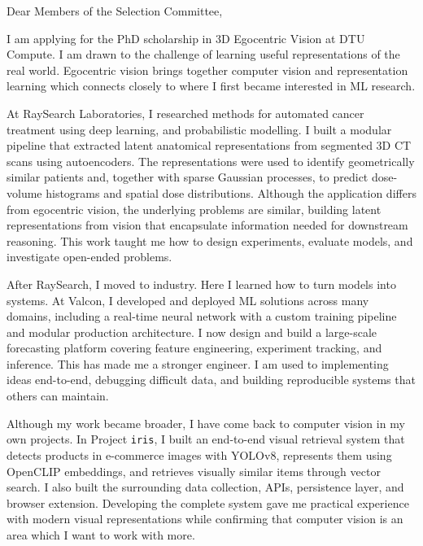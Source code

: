 \documentclass[11pt,a4paper]{moderncv}
\begin{document}
\makecvtitle
Dear Members of the Selection Committee,

\vspace*{2em}
I am applying for the PhD scholarship in 3D Egocentric Vision at DTU Compute. I am drawn to the challenge of learning useful representations of the real world. Egocentric vision brings together computer vision and representation learning which connects closely to where I first became interested in ML research.

\hspace*{2em}
At RaySearch Laboratories, I researched methods for automated cancer treatment using deep learning, and probabilistic modelling. I built a modular pipeline that extracted latent anatomical representations from segmented 3D CT scans using autoencoders. The representations were used to identify geometrically similar patients and, together with sparse Gaussian processes, to predict dose-volume histograms and spatial dose distributions. Although the application differs from egocentric vision, the underlying problems are similar, building latent representations from vision that encapsulate information needed for downstream reasoning. This work taught me how to design experiments, evaluate models, and investigate open-ended problems.

\hspace*{2em}
After RaySearch, I moved to industry. Here I learned how to turn models into systems. At Valcon, I developed and deployed ML solutions across many domains, including a real-time neural network with a custom training pipeline and modular production architecture. I now design and build a large-scale forecasting platform covering feature engineering, experiment tracking, and inference. This has made me a stronger engineer. I am used to implementing ideas end-to-end, debugging difficult data, and building reproducible systems that others can maintain.

\hspace*{2em}
Although my work became broader, I have come back to computer vision in my own projects. In Project \texttt{iris}, I built an end-to-end visual retrieval system that detects products in e-commerce images with YOLOv8, represents them using OpenCLIP embeddings, and retrieves visually similar items through vector search. I also built the surrounding data collection, APIs, persistence layer, and browser extension. Developing the complete system gave me practical experience with modern visual representations while confirming that computer vision is an area which I want to work with more.
\end{document}
